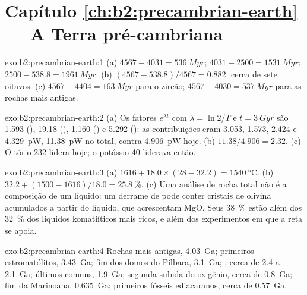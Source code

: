 \section*{Capítulo \ref{ch:b2:precambrian-earth} --- A Terra pré-cambriana}

\begin{solution}{exo:b2:precambrian-earth:1}
(a)  $4567 - 4031 = \qty{536}{Myr}$;  $4031 - 2500 = \qty{1531}{Myr}$;
 $2500 - 538.8 = \qty{1961}{Myr}$. (b) $(4567 - 538.8)/4567 = 0.882$: cerca de sete
oitavos. (c) $4567 - 4404 = \qty{163}{Myr}$ para o zircão; $4567 - 4030 = \qty{537}{Myr}$ para
as rochas mais antigas.
\end{solution}

\begin{solution}{exo:b2:precambrian-earth:2}
(a) Os fatores $e^{\lambda t}$ com $\lambda = \ln2/T$ e $t = \qty{3}{Gyr}$ são 1.593
(), 19.18 (), 1.160 () e 5.292 (): as
contribuições eram 3.053, 1.573, 2.424 e \qty{4.329}{pW}, \qty{11.38}{pW} no total, contra
\qty{4.906}{pW} hoje. (b) $11.38/4.906 = 2.32$. (c) O tório-232 lidera hoje; o potássio-40 liderava
então.
\end{solution}

\begin{solution}{exo:b2:precambrian-earth:3}
(a) $1616 + 18.0\times(28 - 32.2) = \qty{1540}{\celsius}$. (b) $32.2 + (1500 - 1616)/18.0 =
\qty{25.8}{\percent}$. (c) Uma análise de rocha total não é a composição de um líquido: um
derrame de  pode conter cristais de olivina acumulados a partir do líquido, que acrescentam MgO. Seus
\qty{38}{\percent} estão além dos \qty{32}{\percent} dos líquidos komatiíticos mais ricos, e
além dos experimentos em que a reta se apoia.
\end{solution}

\begin{solution}{exo:b2:precambrian-earth:4}
Rochas mais antigas, \qty{4.03}{Ga}; primeiros estromatólitos, \qty{3.43}{Ga}; fim dos domos do Pilbara,
\qty{3.1}{Ga}; , cerca de 2.4 a \qty{2.1}{Ga}; últimos  comuns,
\qty{1.9}{Ga}; segunda subida do oxigênio, cerca de \qty{0.8}{Ga}; fim da Marinoana,
\qty{0.635}{Ga}; primeiros fósseis ediacaranos, cerca de \qty{0.57}{Ga}.
\end{solution}

